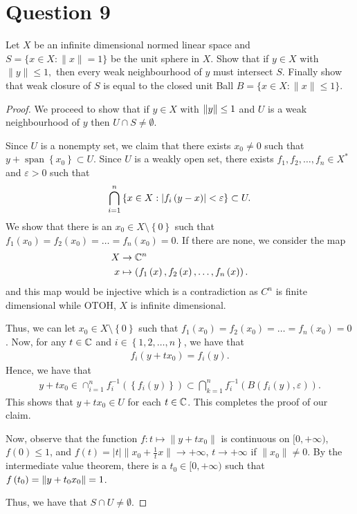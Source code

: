 \section{Question 9}
\horz

Let $X$ be an infinite dimensional normed linear space and $S= \{ x\in X : \|x\|=1\}$ be the unit sphere in $X.$ Show that  if $y\in X$ with $\|y\| \leqslant 1,$ then every weak neighbourhood of $y$ must intersect $S.$ Finally show that weak closure of $S$ is equal to the closed unit Ball $B= \{x\in X : \|x\| \leqslant 1 \}.$

\horz

\begin{proof}
    We proceed to show that if $y \in X$ with $\left\lVert y \right\rVert \le 1$ and $U$ is a weak neighbourhood of $y$ then $U \cap S \ne \emptyset$. 

    Since $U$ is a nonempty set, we claim that there exists $x_{0}\ne 0$ such that $y + \operatorname{span} \left\{ x_{0} \right\} \subset U$. Since $U$ is a weakly open set, there exists $f_{1}, f_{2}, \ldots, f_{n} \in X^{*}$ and $\varepsilon > 0$ such that 
\begin{align*}
    \bigcap_{i=1}^{n} \left\{ x \in X : \left\lvert f_{i}\left( y-x \right) \right\rvert < \varepsilon \right\} \subset U.
\end{align*}
We show that there is an $x_{0} \in X \setminus \left\{ 0 \right\}$ such that $f_{1} \left( x_{0} \right) = f_{2}\left( x_{0} \right) = \ldots = f_{n} \left( x_{0} \right) = 0$. If there are none, we consider the map
\begin{align*}
    X &\to \mathbb C ^{n} \\
    x &\mapsto \left( f_{1} \left( x \right), f_{2} \left( x \right), \ldots, f_{n} \left( x \right) \right).
\end{align*}
and this map would be injective which is a contradiction as $C^{n}$ is finite dimensional while OTOH, $X$ is infinite dimensional.

Thus, we can let $x_{0} \in X \setminus \left\{ 0 \right\}$ such that $f_{1} \left( x_{0} \right) = f_{2} \left( x_{0} \right) = \ldots = f_{n} \left( x_{0} \right) = 0$. Now, for any $t \in \mathbb C$ and $i \in \left\{ 1,2, \ldots, n \right\}$, we have that
\begin{align*}
    f_{i}\left( y + tx_{0} \right) = f_{i} \left( y \right).
\end{align*}
Hence, we have that 
\begin{align*}
    y+tx_{0} \in \cap_{i=1}^{n} f_{i} ^{-1} \left( \left\{ f_{i} \left( y \right) \right\} \right) \subset \bigcap_{k=1}^{n} f_{i}^{-1} \left( B\left( f_{i}\left( y \right), \varepsilon \right) \right).
\end{align*}
This shows that $y+tx_{0} \in U$ for each $t \in \mathbb C$. This completes the proof of our claim.

Now, observe that the function $f \colon t \mapsto \|y+t x_0\|$ is continuous on $[0, +\infty)$, $f(0) \le 1$, and $f(t) = |t|\|x_0 + \frac1t x\| \to +\infty$, $t \to +\infty$ if $\|x_0\| \ne 0$. By the intermediate value theorem, there is a $t_{0} \in [0, +\infty )$ such that $f\left( t_{0} \right) = \left\lVert y+t_{0} x_{0} \right\rVert = 1$.

Thus, we have that $S \cap U \ne \emptyset$. 
\end{proof}
